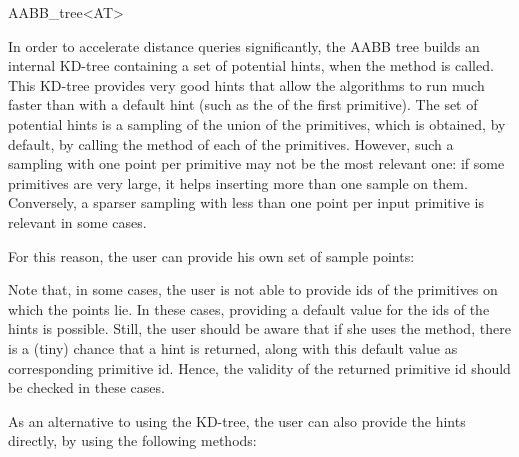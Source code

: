 \begin{ccRefClass}{AABB_tree<AT>}
\begin{ccAdvanced}
In order to accelerate distance queries significantly, the AABB tree builds an internal KD-tree containing a set of potential hints, when the method  is called. This KD-tree provides very good hints that allow the algorithms to run much faster than with a default hint (such as the  of the first primitive). The set of potential hints is a sampling of the union of the primitives, which is obtained, by default, by calling the method  of each of the primitives. However, such a sampling with one point per primitive may not be the most relevant one: if some primitives are very large, it helps inserting more than one sample on them. Conversely, a sparser sampling with less than one point per input primitive is relevant in some cases.

For this reason, the user can provide his own set of sample points:


Note that, in some cases, the user is not able to provide ids of the primitives on which the points lie. In these cases, providing a default value for the ids of the hints is possible. Still, the user should be aware that if she uses the  method, there is a (tiny) chance that a hint is returned, along with this default value as corresponding primitive id. Hence, the validity of the returned primitive id should be checked in these cases.

As an alternative to using the KD-tree, the user can also provide the hints directly, by using the following methods:




\end{ccAdvanced}
\end{ccRefClass}
